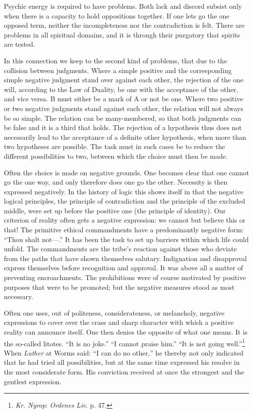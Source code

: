 \documentclass[12pt,a4paper]{book}
\newcommand{\opage}[1]{\marginnote{\footnotesize\textit{[#1]}}}
\begin{document}
Psychic energy is required to have problems. Both lack and discord subsist
only when there is a capacity to hold oppositions together. If one lets go
the one opposed term, neither the incompleteness nor the contradiction is
felt. There are problems in all spiritual domains, and it is through their
purgatory that spirits are tested.

In this connection we keep to the second kind of problems, that due to the
collision between judgments. Where a simple positive and the corresponding
simple negative judgment stand over against each other, the rejection of
the one will, according to the Law of Duality, be one with the acceptance
of the other, and vice versa. B must either be a mark of A or not be one.
Where two positive or two negative judgments stand against each other, the
relation will not always be so simple. The relation can be many-membered,
so that both judgments can be false and it is a third that holds. The
rejection of a hypothesis thus does not necessarily lead to the acceptance
of a definite other hypothesis, when more than two hypotheses are
possible. The task must in such cases be to reduce the different
possibilities to two, between which the choice must then be made.

Often the choice is made on negative grounds. One becomes clear that one
cannot go the one way, and only therefore does one go the other. Necessity
is then expressed negatively. In the history of logic this shows itself in
that the negative logical principles, the principle of contradiction and
the principle of the excluded middle, were set up before the positive one
(the principle of identity). Our criterion of reality often gets a
negative expression: we cannot but believe this or that! The primitive
ethical commandments have a predominantly negative form: ``Thou \opage{80}shalt
not---.'' It has been the task to set up barriers within which life could
unfold. The commandments are the tribe's reaction against those who
deviate from the paths that have shown themselves salutary. Indignation
and disapproval express themselves before recognition and approval. It was
above all a matter of preventing encroachments. The prohibitions were of
course motivated by positive purposes that were to be promoted; but the
negative measures stood as most necessary.

Often one uses, out of politeness, considerateness, or melancholy,
negative expressions to cover over the crass and sharp character with
which a positive reality can announce itself. One then denies the opposite
of what one means. It is the so-called litotes. ``It is no joke.'' ``I
cannot praise him.'' ``It is not going well.''\footnote{\emph{Kr. Nyrop}:
\emph{Ordenes Liv}. p. 47.} When \emph{Luther} at Worms said: ``I can do
no other,'' he thereby not only indicated that he had tried all
possibilities, but at the same time expressed his resolve in the most
considerate form. His conviction received at once the strongest and the
gentlest expression.
\end{document}
